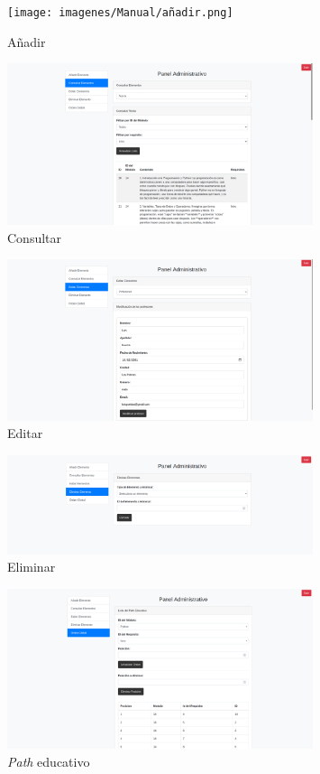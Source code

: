 \begin{appendices}
\begin{figure}[H]
    \centering
    \texttt{[image: imagenes/Manual/añadir.png]}
    \caption{Añadir}
\end{figure}

\begin{figure}[H]
    \centering
    \includegraphics[width=0.8\textwidth]{imagenes/Manual/consultar.png}
    \caption{Consultar}
\end{figure}

\begin{figure}[H]
    \centering
    \includegraphics[width=0.8\textwidth]{imagenes/Manual/editar.png}
    \caption{Editar}
\end{figure}

\begin{figure}[H]
    \centering
    \includegraphics[width=0.8\textwidth]{imagenes/Manual/eliminar.png}
    \caption{Eliminar}
\end{figure}

\begin{figure}[H]
    \centering
    \includegraphics[width=0.8\textwidth]{imagenes/Manual/ordenglobal.png}
    \caption{\textit{Path} educativo}
\end{figure}


\end{appendices}